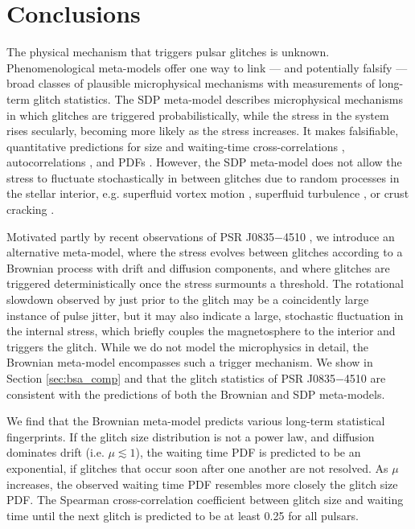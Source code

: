 \section{Conclusions}
The physical mechanism that triggers pulsar glitches is unknown. Phenomenological meta-models offer one way to link --- and potentially falsify --- broad classes of plausible microphysical mechanisms with measurements of long-term glitch statistics. The SDP meta-model \citep{Fulgenzi2017} describes microphysical mechanisms in which glitches are triggered probabilistically, while the stress in the system rises secularly, becoming more likely as the stress increases. It makes falsifiable, quantitative predictions for size and waiting-time cross-correlations \citep{Melatos2018}, autocorrelations \citep{Carlin2019ac}, and PDFs \citep{Carlin2019quasi}. However, the SDP meta-model does not allow the stress to fluctuate stochastically in between glitches due to random processes in the stellar interior, e.g. superfluid vortex motion \citep{Warszawski2011}, superfluid turbulence \citep{Melatos2010, Melatos2014}, or crust cracking \citep{Horowitz2009}. 

Motivated partly by recent observations of PSR J0835$-$4510 \citep{Ashton2019}, we introduce an alternative meta-model, where the stress evolves between glitches according to a Brownian process with drift and diffusion components, and where glitches are triggered deterministically once the stress surmounts a threshold. The rotational slowdown observed by \citet{Ashton2019} just prior to the glitch may be a coincidently large instance of pulse jitter, but it may also indicate a large, stochastic fluctuation in the internal stress, which briefly couples the magnetosphere to the interior and triggers the glitch. While we do not model the microphysics in detail, the Brownian meta-model encompasses such a trigger mechanism. We show in Section \ref{sec:bsa_comp} and \citet{Carlin2019ac} that the glitch statistics of PSR J0835$-$4510 are consistent with the predictions of both the Brownian and SDP meta-models.

We find that the Brownian meta-model predicts various long-term statistical fingerprints. If the glitch size distribution is not a power law, and diffusion dominates drift (i.e. $\mu \lesssim 1$), the waiting time PDF is predicted to be an exponential, if glitches that occur soon after one another are not resolved. As $\mu$ increases, the observed waiting time PDF resembles more closely the glitch size PDF. The Spearman cross-correlation coefficient between glitch size and waiting time until the next glitch is predicted to be at least 0.25 for all pulsars.

